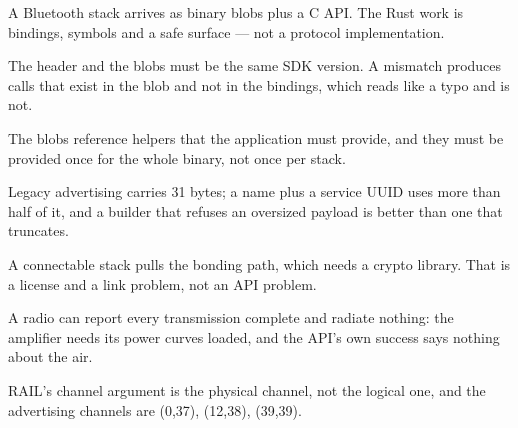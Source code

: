 \begin{keytakeaways}
    \item A Bluetooth stack arrives as binary blobs plus a C API. The Rust work is bindings, symbols
          and a safe surface — not a protocol implementation.
    \item The header and the blobs must be the same SDK version. A mismatch produces calls that exist
          in the blob and not in the bindings, which reads like a typo and is not.
    \item The blobs reference  helpers that the application must provide, and they
          must be provided once for the whole binary, not once per stack.
    \item Legacy advertising carries 31 bytes; a name plus a service UUID uses more than half of it,
          and a builder that refuses an oversized payload is better than one that truncates.
    \item A connectable stack pulls the bonding path, which needs a crypto library. That is a license
          and a link problem, not an API problem.
    \item A radio can report every transmission complete and radiate nothing: the amplifier needs its
          power curves loaded, and the API's own success says nothing about the air.
    \item RAIL's channel argument is the physical channel, not the logical one, and the advertising
          channels are (0,37), (12,38), (39,39).
\end{keytakeaways}
